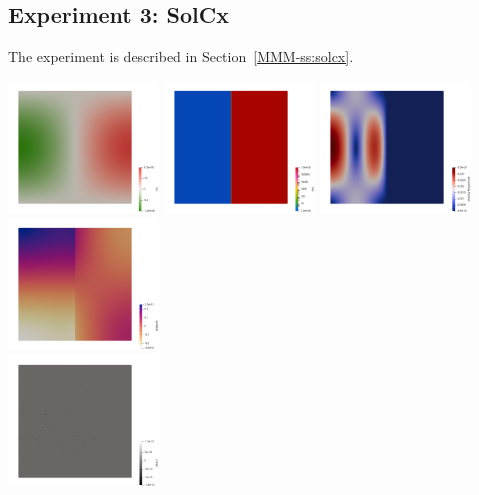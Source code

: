 \newpage
\subsection*{Experiment 3: SolCx}

The experiment is described in Section~\ref{MMM-ss:solcx}.

\begin{center}
\includegraphics[width=4cm]{python_codes/fieldstone_158/results/exp3/rho}
\includegraphics[width=4cm]{python_codes/fieldstone_158/results/exp3/eta}
\includegraphics[width=4cm]{python_codes/fieldstone_158/results/exp3/vel}
\includegraphics[width=4cm]{python_codes/fieldstone_158/results/exp3/press}\\
\includegraphics[width=4cm]{python_codes/fieldstone_158/results/exp3/divv}

\end{center}
